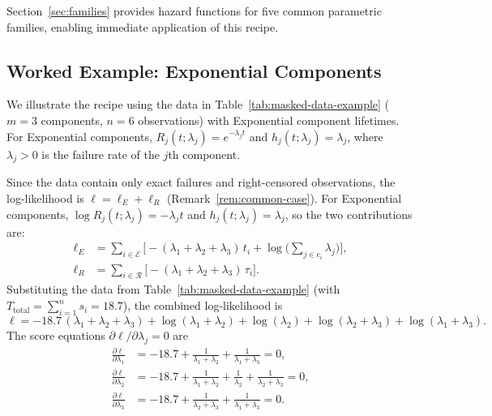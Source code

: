 \documentclass[11pt]{article}
\theoremstyle{definition}
\theoremstyle{plain}
\begin{document}
Section~\ref{sec:families} provides hazard functions for five common
parametric families, enabling immediate application of this recipe.

\subsection{Worked Example: Exponential Components}
\label{sec:worked-example}

We illustrate the recipe using the data in
Table~\ref{tab:masked-data-example} ($m = 3$ components, $n = 6$
observations) with Exponential component lifetimes.
For Exponential components, $R_j(t; \lambda_j) = e^{-\lambda_j t}$
and $h_j(t; \lambda_j) = \lambda_j$, where $\lambda_j > 0$ is the
failure rate of the $j$th component.

Since the data contain only exact failures and right-censored
observations, the log-likelihood is
$\ell = \ell_E + \ell_R$ (Remark~\ref{rem:common-case}).
For Exponential components, $\log R_j(t; \lambda_j) = -\lambda_j t$
and $h_j(t; \lambda_j) = \lambda_j$, so the two contributions are:
\begin{align}
\label{eq:ll-exp-E}
    \ell_E
    &= \sum_{i \in \mathcal{E}} \biggl[
        -(\lambda_1 + \lambda_2 + \lambda_3) \, t_i
        + \log\biggl(\sum_{j \in c_i} \lambda_j\biggr)
    \biggr], \\[4pt]
\label{eq:ll-exp-R}
    \ell_R
    &= \sum_{i \in \mathcal{R}}
        \bigl[-(\lambda_1 + \lambda_2 + \lambda_3) \, \tau_i\bigr].
\end{align}
Substituting the data from Table~\ref{tab:masked-data-example}
(with $T_{\mathrm{total}} = \sum_{i=1}^n s_i = 18.7$),
the combined log-likelihood is
\begin{equation}
\label{eq:ll-exponential-explicit}
    \ell = -18.7 \, (\lambda_1 + \lambda_2 + \lambda_3)
    + \log(\lambda_1 + \lambda_2)
    + \log(\lambda_2)
    + \log(\lambda_2 + \lambda_3)
    + \log(\lambda_1 + \lambda_3).
\end{equation}
The score equations $\partial \ell / \partial \lambda_j = 0$ are
\begin{align}
    \frac{\partial \ell}{\partial \lambda_1}
    &= -18.7
        + \frac{1}{\lambda_1 + \lambda_2}
        + \frac{1}{\lambda_1 + \lambda_3} = 0,
        \label{eq:score-exp-1} \\
    \frac{\partial \ell}{\partial \lambda_2}
    &= -18.7
        + \frac{1}{\lambda_1 + \lambda_2}
        + \frac{1}{\lambda_2}
        + \frac{1}{\lambda_2 + \lambda_3} = 0,
        \label{eq:score-exp-2} \\
    \frac{\partial \ell}{\partial \lambda_3}
    &= -18.7
        + \frac{1}{\lambda_2 + \lambda_3}
        + \frac{1}{\lambda_1 + \lambda_3} = 0.
        \label{eq:score-exp-3}
\end{align}
\end{document}
